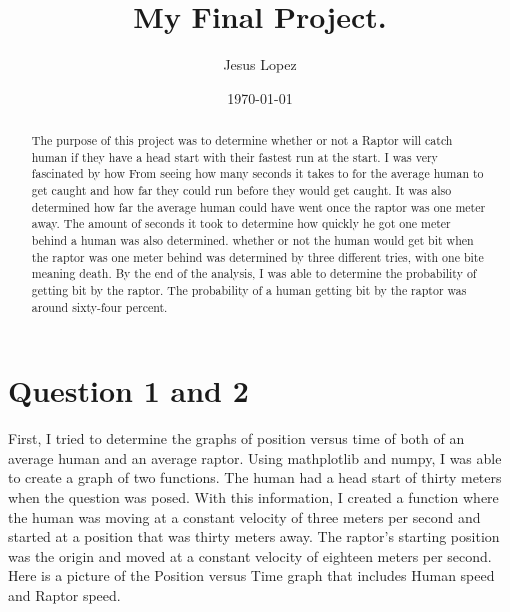 \documentclass[twocolumn]{revtex4}
\begin{document}
\title{
My Final Project.
}

\author{Jesus Lopez}

\date{\today}
\begin{abstract}
    
    The purpose of this project was to determine whether or not a Raptor will catch human if they have a head start with their fastest run at the start. I was very fascinated by how From seeing how many seconds it takes to for the average human to get caught and how far they could run before they would get caught. It was also determined how far the average human could have went once the raptor was one meter away. The amount of seconds it took to determine how quickly he got one meter behind a human was also determined. whether or not the human would get bit when the raptor was one meter behind was determined by three different tries, with one bite meaning death. By the end of the analysis, I was able to determine the probability of getting bit by the raptor. The probability of a human getting bit by the raptor was around sixty-four percent. 
    
\end{abstract}

\maketitle

\section{Question 1 and 2}
	First, I tried to determine the graphs of position versus time of both of an average human and an average raptor. Using mathplotlib and numpy, I was able to create a graph of two functions.  The human had a head start of thirty meters when the question was posed. With this information, I created a function where the human was moving at a constant velocity of three meters per second and started at a position that was thirty meters away. The raptor's starting position was the origin and moved at a constant velocity of eighteen meters per second. 
Here is a picture of the Position versus Time graph that includes Human speed and Raptor speed.
\end{document}

